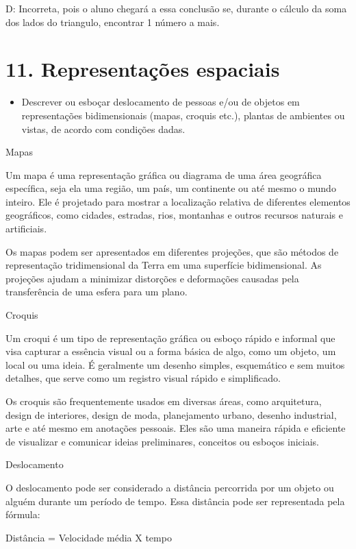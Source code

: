 {D: Incorreta, pois o aluno chegará a essa conclusão se, durante o
cálculo da soma dos lados do triangulo, encontrar 1 número a mais.


\section{11. Representações
espaciais}

\begin{itemize}
\tightlist
\item
  Descrever ou esboçar deslocamento de pessoas e/ou de objetos em
  representações bidimensionais (mapas, croquis etc.), plantas de
  ambientes ou vistas, de acordo com condições dadas.
\end{itemize}

Mapas

Um mapa é uma representação gráfica ou diagrama de uma área geográfica
específica, seja ela uma região, um país, um continente ou até mesmo o
mundo inteiro. Ele é projetado para mostrar a localização relativa de
diferentes elementos geográficos, como cidades, estradas, rios,
montanhas e outros recursos naturais e artificiais.

Os mapas podem ser apresentados em diferentes projeções, que são métodos
de representação tridimensional da Terra em uma superfície
bidimensional. As projeções ajudam a minimizar distorções e deformações
causadas pela transferência de uma esfera para um plano.

Croquis

Um croqui é um tipo de representação gráfica ou esboço rápido e informal
que visa capturar a essência visual ou a forma básica de algo, como um
objeto, um local ou uma ideia. É geralmente um desenho simples,
esquemático e sem muitos detalhes, que serve como um registro visual
rápido e simplificado.

Os croquis são frequentemente usados em diversas áreas, como
arquitetura, design de interiores, design de moda, planejamento urbano,
desenho industrial, arte e até mesmo em anotações pessoais. Eles são uma
maneira rápida e eficiente de visualizar e comunicar ideias
preliminares, conceitos ou esboços iniciais.

Deslocamento

O deslocamento pode ser considerado a distância percorrida por um objeto
ou alguém durante um período de tempo. Essa distância pode ser
representada pela fórmula:

Distância = Velocidade média X tempo

}
